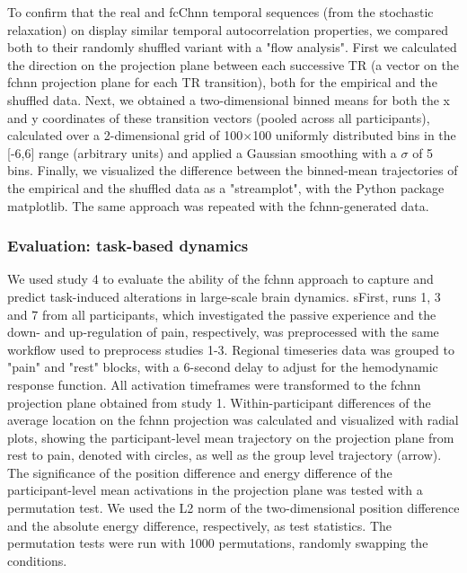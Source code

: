 \documentclass{article}
\begin{document}
To confirm that the real and fcC\acrshort{hnn} temporal sequences (from the stochastic relaxation) on display similar temporal autocorrelation properties, we compared both to their randomly shuffled variant with a "flow analysis".
First we calculated the direction on the projection plane between each successive TR (a vector on the \acrshort{fchnn} projection plane for each TR transition), both for the empirical and the shuffled data.
Next, we obtained a two-dimensional binned means for both the x and y coordinates of these transition vectors (pooled across all participants), calculated over a 2-dimensional grid of 100$\times$100 uniformly distributed bins in the [-6,6] range (arbitrary units) and applied a Gaussian smoothing with a $\sigma$ of 5 bins.
Finally, we visualized the difference between the binned-mean trajectories of the empirical and the shuffled data as a "streamplot", with the Python package matplotlib.
The same approach was repeated with the \acrshort{fchnn}-generated data.

\subsubsection{Evaluation: task-based dynamics}

We used study 4 to evaluate the ability of the \acrshort{fchnn} approach to capture and predict task-induced alterations in large-scale brain dynamics.
sFirst, runs 1, 3 and 7 from all participants, which investigated the passive experience and the down- and up-regulation of pain, respectively, was preprocessed with the same workflow used to preprocess studies 1-3. Regional timeseries data was grouped to "pain" and "rest" blocks, with a 6-second delay to adjust for the hemodynamic response function. All activation timeframes were transformed to the \acrshort{fchnn} projection plane obtained from study 1. Within-participant differences of the average location on the \acrshort{fchnn} projection was calculated and visualized with radial plots, showing the participant-level mean trajectory on the projection plane from rest to pain, denoted with circles, as well as the group level trajectory (arrow). The significance of the position difference and energy difference of the participant-level mean activations in the projection plane was tested with a permutation test. We used the L2 norm of the two-dimensional position difference and the absolute energy difference, respectively, as test statistics. The permutation tests were run with 1000 permutations, randomly swapping the conditions.
\end{document}
